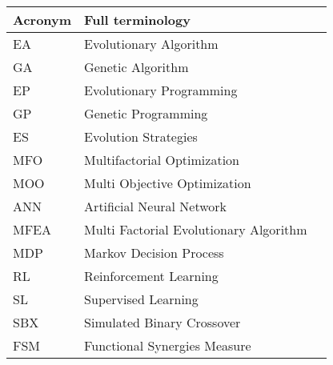 \fontsize{12}{16}\selectfont

\begin{center}
\begin{tabular}{|l|l|l|}

\hline
\textbf{Acronym} & \textbf{Full terminology}\\ \hline
    EA & Evolutionary Algorithm \\ \hline
    GA & Genetic Algorithm \\ \hline
    EP & Evolutionary Programming \\ \hline
    GP & Genetic Programming \\ \hline
    ES & Evolution Strategies \\ \hline
    
    MFO & Multifactorial Optimization \\ \hline
    MOO & Multi Objective Optimization \\ \hline
     
    ANN & Artificial Neural Network \\ \hline
    MFEA & Multi Factorial Evolutionary Algorithm \\ \hline
    MDP & Markov Decision Process \\ \hline
     
    RL & Reinforcement Learning \\ \hline
    SL & Supervised Learning \\ \hline
     
    SBX & Simulated Binary Crossover \\ \hline
     
    FSM & Functional Synergies Measure \\ \hline
\end{tabular}    
\end{center}
\pagebreak